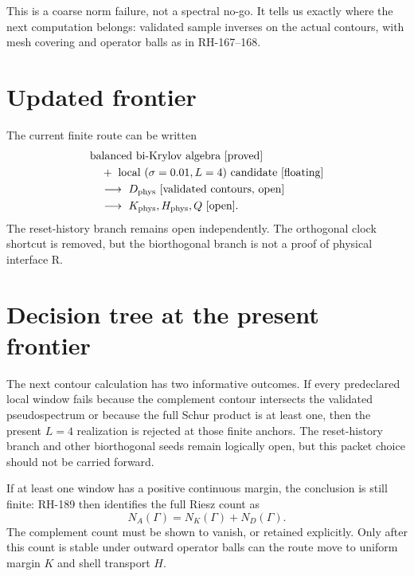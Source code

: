 \documentclass[12pt]{article}
\theoremstyle{remark}
\begin{document}
This is a coarse norm failure, not a spectral no-go.  It tells us exactly
where the next computation belongs: validated sample inverses on the actual
contours, with mesh covering and operator balls as in RH-167--168.

\section{Updated frontier}

The current finite route can be written
\begin{equation}\label{eq:route}
 \begin{aligned}
 &\text{balanced bi-Krylov algebra [proved]}\\
 &\quad+\ \text{local }(\sigma=0.01,L=4)\text{ candidate [floating]}\\
 &\quad\longrightarrow\ D_{\rm phys}\text{ [validated contours, open]}\\
 &\quad\longrightarrow\ K_{\rm phys},H_{\rm phys},Q\text{ [open]}.
 \end{aligned}
\end{equation}
The reset-history branch remains open independently.  The orthogonal clock
shortcut is removed, but the biorthogonal branch is not a proof of physical
interface R.

\section{Decision tree at the present frontier}

The next contour calculation has two informative outcomes.  If every
predeclared local window fails because the complement contour intersects the
validated pseudospectrum or because the full Schur product is at least one,
then the present $L=4$ realization is rejected at those finite anchors.  The
reset-history branch and other biorthogonal seeds remain logically open, but
this packet choice should not be carried forward.

If at least one window has a positive continuous margin, the conclusion is
still finite: RH-189 then identifies the full Riesz count as
\begin{equation}\label{eq:count-ledger}
 N_A(\Gamma)=N_K(\Gamma)+N_D(\Gamma).
\end{equation}
The complement count must be shown to vanish, or retained explicitly.  Only
after this count is stable under outward operator balls can the route move to
uniform margin $K$ and shell transport $H$.
\end{document}
